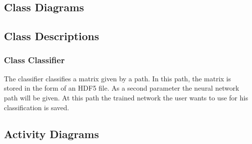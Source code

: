 \documentclass[parskip=full]{scrartcl}
\begin{document}
\subsection{Class Diagrams}

\begin{figure}[h]
\begin{center}

\label{Class Diagram}
\end{center}
\end{figure}

\newpage


\subsection{Class Descriptions}

\subsubsection{Class Classifier}
The classifier classifies a matrix given by a path. 
In this path, the matrix is stored in the form of an \gls{HDF5} file.
As a second parameter the \gls{neural network} path will be given. 
At this path the trained network the user wants to use for his classification is saved.

\newpage
 
\subsection{Activity Diagrams}
\end{document}
